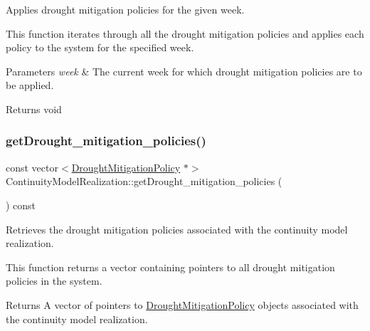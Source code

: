 Applies drought mitigation policies for the given week. 

This function iterates through all the drought mitigation policies and applies each policy to the system for the specified week.


\begin{DoxyParams}{Parameters}
{\em week} & The current week for which drought mitigation policies are to be applied.\\
\hline
\end{DoxyParams}
\begin{DoxyReturn}{Returns}
void 
\end{DoxyReturn}
\mbox{\label{classContinuityModelRealization_afadb3e7f51ae7a09948ffc73d7eb7f6b}} 
\subsubsection{\texorpdfstring{get\+Drought\+\_\+mitigation\+\_\+policies()}{getDrought\_mitigation\_policies()}}
{\footnotesize\ttfamily const vector$<$\mbox{\hyperlink{classDroughtMitigationPolicy}{Drought\+Mitigation\+Policy}} $\ast$$>$ Continuity\+Model\+Realization\+::get\+Drought\+\_\+mitigation\+\_\+policies (\begin{DoxyParamCaption}{ }\end{DoxyParamCaption}) const}



Retrieves the drought mitigation policies associated with the continuity model realization. 

This function returns a vector containing pointers to all drought mitigation policies in the system.

\begin{DoxyReturn}{Returns}
A {\ttfamily vector} of pointers to {\ttfamily \mbox{\hyperlink{classDroughtMitigationPolicy}{Drought\+Mitigation\+Policy}}} objects associated with the continuity model realization. 
\end{DoxyReturn}
\mbox{\label{classContinuityModelRealization_a5b9405156e8cc21c8781ea15ee46c8fe}} 
